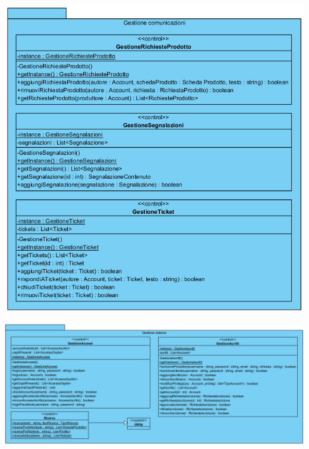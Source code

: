 \begin{center}
			\includegraphics[width=\textwidth]{assets/visualParadigm/classi/GestioniComunicazioni}
\end{center}

\begin{landscape}
\begin{center}
			\includegraphics[width=\linewidth]{assets/visualParadigm/classi/GestioneSistema}
\end{center}
\end{landscape}

